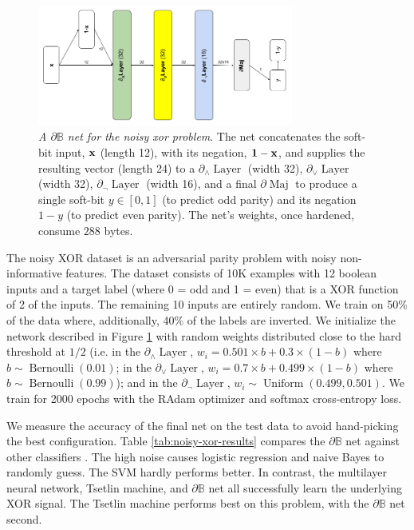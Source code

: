 \documentclass{article}
\theoremstyle{plain}
\theoremstyle{definition}
\theoremstyle{remark}
\begin{document}
\begin{figure}
	\centering
	\includegraphics[width=0.75\textwidth]{../noisy-xor-architecture.png}
	\caption{{\em A $\partial\mathbb{B}$ net for the noisy xor problem}. The net concatenates the soft-bit input, ${\bf x}$ (length 12), with its negation, ${\bf 1 - x}$, and supplies the resulting vector (length 24) to a $\partial_{\wedge}\!\!\operatorname{Layer}$ (width 32), $\partial_{\vee}\!\!\operatorname{Layer}$ (width 32),  $\partial_{\neg} \!\operatorname{Layer}$ (width 16), and a final $\partial\!\operatorname{Maj}$ to produce a single soft-bit $y \in [0,1]$ (to predict odd parity) and its negation $1-y$ (to predict even parity). The net's weights, once hardened, consume $288$ bytes.}
	\label{fig:noisy-xor-architecture}
\end{figure}

The noisy XOR dataset \cite{noisy-xor-dataset} is an adversarial parity problem with noisy non-informative features. The dataset consists of 10K examples with 12 boolean inputs and a target label (where 0 = odd and 1 = even) that is a XOR function of 2 of the inputs. The remaining 10 inputs are entirely random. We train on 50\% of the data where, additionally, 40\% of the labels are inverted. We initialize the network described in Figure \ref{fig:noisy-xor-architecture} with random weights distributed close to the hard threshold at $1/2$ (i.e. in the $\partial_{\wedge}\!\operatorname{Layer}$, $w_{i} = 0.501 \times b + 0.3 \times (1-b)$ where $b \sim \operatorname{Bernoulli}(0.01)$; in the $\partial_{\vee}\!\operatorname{Layer}$, $w_{i} = 0.7 \times b + 0.499 \times (1-b)$ where $b \sim \operatorname{Bernoulli}(0.99)$); and in the $\partial_{\neg}\!\operatorname{Layer}$, $w_{i} \sim \operatorname{Uniform}(0.499, 0.501)$. We train for 2000 epochs with the RAdam optimizer and softmax cross-entropy loss. 

We measure the accuracy of the final net on the test data to avoid hand-picking the best configuration. Table \ref{tab:noisy-xor-results} compares the $\partial\mathbb{B}$ net against other classifiers \cite{granmo18}. The high noise causes logistic regression and naive Bayes to randomly guess. The SVM hardly performs better. In contrast, the multilayer neural network, Tsetlin machine, and  $\partial\mathbb{B}$ net all successfully learn the underlying XOR signal. The Tsetlin machine performs best on this problem, with the $\partial\mathbb{B}$ net second.
\end{document}
